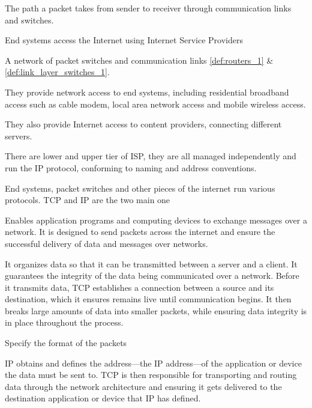 \begin{definition}\label{def:route_path_1}
    The path a packet takes from sender to receiver through communication links and switches.    
\end{definition}

\newpage

\begin{note}\label{note:end_systems_2}
    End systems access the Internet using Internet Service Providers 
\end{note}


\begin{definition}[isp]\label{def:isp_1}
    A network of packet switches and communication links \ref{def:routers_1} \& \ref{def:link_layer_switches_1}. 
    
    They provide network access to end systems, including residential broadband access such as cable modem, local area network access and mobile wireless access. 

    They also provide Internet access to content providers, connecting different servers. 

    There are lower and upper tier of ISP, they are all managed independently and run the IP protocol, conforming to naming and address conventions.
\end{definition}

\begin{definition*}
    End systems, packet switches and other pieces of the internet run various protocols. TCP and IP are the two main one
    \begin{definition}\label{def:tcp_1}
         Enables application programs and computing devices to exchange messages over a network. It is designed to send packets across the internet and ensure the successful delivery of data and messages over networks.

         It organizes data so that it can be transmitted between a server and a client. It guarantees the integrity of the data being communicated over a network. Before it transmits data, TCP establishes a connection between a source and its destination, which it ensures remains live until communication begins. It then breaks large amounts of data into smaller packets, while ensuring data integrity is in place throughout the process.
    \end{definition}
    \begin{definition}\label{def:IP_1}
        Specify the format of the packets
    \end{definition}

    \begin{note}[differences]\label{note:ip_vs_tcp_1}
        IP obtains and defines the address—the IP address—of the application or device the data must be sent to. TCP is then responsible for transporting and routing data through the network architecture and ensuring it gets delivered to the destination application or device that IP has defined.
    \end{note}
\end{definition*}

